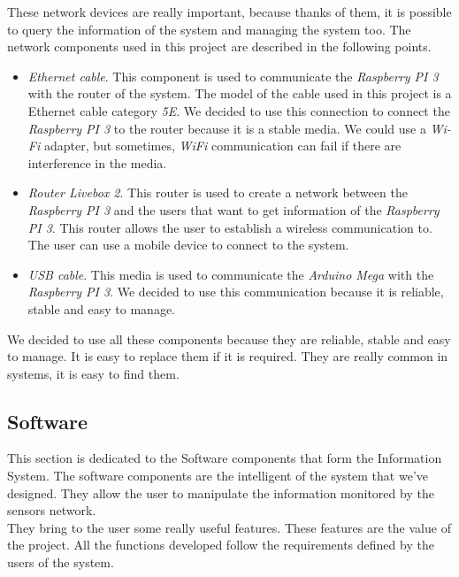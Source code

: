 These network devices are really important, because thanks of them, it is possible to query the information of the system and managing the system too. The network components used in this project are described in the following points.\\

\begin{itemize}

\item \textit{Ethernet cable}. This component is used to communicate the \textit{Raspberry PI 3} with the router of the system. The model of the cable used in this project is a Ethernet cable category \textit{5E}. We decided to use this connection to connect the \textit{Raspberry PI 3} to the router because it is a stable media. We could use a \textit{Wi-Fi} adapter, but sometimes, \textit{WiFi} communication can fail if there are interference in the media.

\item \textit{Router Livebox 2}. This router is used to create a network between the \textit{Raspberry PI 3} and the users that want to get information of the \textit{Raspberry PI 3}. This router allows the user to establish a wireless communication to. The user can use a mobile device to connect to the system.

\item \textit{USB cable}. This media is used to communicate the \textit{Arduino Mega} with the \textit{Raspberry PI 3}. We decided to use this communication because it is reliable, stable and easy to manage.

\end{itemize}

We decided to use all these components because they are reliable, stable and easy to manage. It is easy to replace them if it is required. They are really common in systems, it is easy to find them.

\subsection{Software}

This section is dedicated to the Software components that form the Information System. The software components are the intelligent of the system that we've designed. They allow the user to manipulate the information monitored by the sensors network.\\

They bring to the user some really useful features. These features are the value of the project. All the functions developed follow the requirements defined by the users of the system.\\

